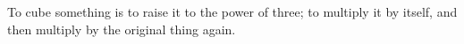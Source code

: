 To cube something is to raise it to the power of three; to
multiply it by itself, and then multiply by the original thing again.